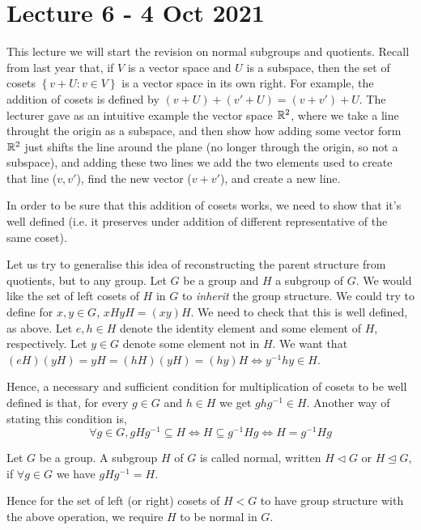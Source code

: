 \section{Lecture 6 - 4 Oct 2021}
This lecture we will start the revision on normal subgroups and quotients.
Recall from last year that, if $V$ is a vector space and $U$ is a subspace, then the set
of cosets $\left\{ v+ U: v\in V \right\}$ is a vector space in its own right. For example,
the addition of cosets is defined by $(v+U)+(v'+U)=(v+v')+U$. The lecturer gave as an
intuitive example the vector space $\mathbb R^2$, where we take a line throught the origin as a
subspace, and then show how adding some vector form $\mathbb R^2$ just shifts the line around
the plane (no longer through the origin, so not a subspace), and adding these two lines we
add the two elements used to create that line ($v,v'$), find the new vector ($v+v'$), and
create a new line.

In order to be sure that this addition of cosets works, we need to show that it's well
defined (i.e. it preserves under addition of different representative of the same coset).


Let us try to generalise this idea of reconstructing the parent structure from quotients,
but to any group. Let $G$ be a group and $H$ a subgroup of $G$. We would like the set of
left cosets of $H$ in $G$ to \emph{inherit} the group structure. We could try to define
for $x,y\in G$, $xH yH=(xy)H$. We need to check that this is well defined, as above. Let
$e,h\in H$ denote the identity element and some element of $H$, respectively. Let $y\in G$
denote some element not in $H$. We want that $(eH)(yH)=yH = (hH)(yH)=(hy)H \iff
y^{-1}hy\in H$. 

Hence, a necessary and sufficient condition for multiplication of cosets
to be well defined is that, for every $g\in G$ and $h\in H$ we get $ghg^{-1}\in H$.
Another way of stating this condition is,
\[\forall g\in G, gHg^{-1}\subseteq H \iff H\subseteq g^{-1}H g \iff H=g^{-1}H g\]

\begin{definition}
  Let $G$ be a group. A subgroup $H$ of $G$ is called normal, written $H\triangleleft G$
  or $H\trianglelefteq G$, if $\forall g\in G$ we have $gHg^{-1}=H$.
  \label{normalSubgroup}
\end{definition}

Hence for the set of left (or right) cosets of $H<G$ to have group structure with the
above operation, we require $H$ to be normal in $G$.


